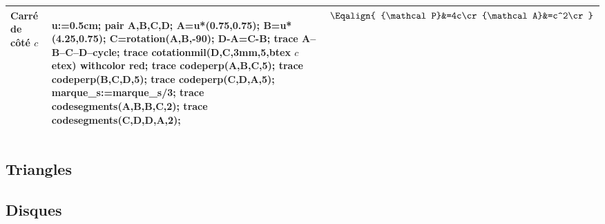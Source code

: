 {\begin{center}
\begin{longtable}{|>{\centering\arraybackslash}m{}|>{\centering\arraybackslash}m{}|>{\centering\arraybackslash}m{}|}
            \textbf{ Carré} de côté $c$  
            &
            \rule[-0.5cm]{0pt}{3.2cm}            
            \begin{Geometrie}[CoinBG={(0,-.5u)},CoinHD={(5u,5.5u)}]    
                u:=0.5cm;
                pair A,B,C,D;
                A=u*(0.75,0.75);
                B=u*(4.25,0.75);
                C=rotation(A,B,-90);
                D-A=C-B;
                trace A--B--C--D--cycle;
                trace cotationmil(D,C,3mm,5,btex $c$ etex) withcolor red;
                trace codeperp(A,B,C,5);
                trace codeperp(B,C,D,5);
                trace codeperp(C,D,A,5);
                marque_s:=marque_s/3;
                trace codesegments(A,B,B,C,2);
                trace codesegments(C,D,D,A,2);
            \end{Geometrie}
            &
            $\Eqalign{
            {\mathcal P}&=4c\cr
            {\mathcal A}&=c^2\cr
            }$\\\hline
        \end{longtable}
    \end{center}
}
\subsection{Triangles}

\subsection{Disques}
